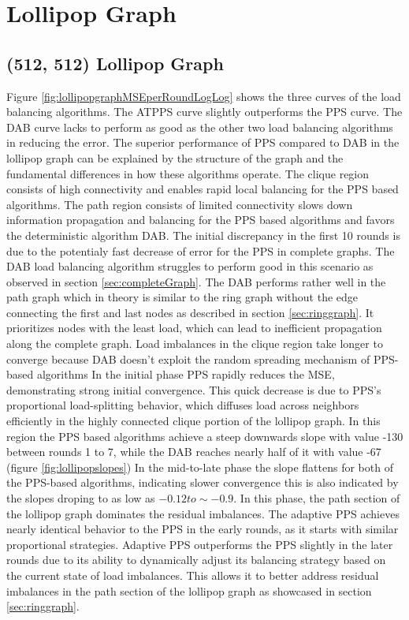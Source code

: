 \section{Lollipop Graph}\label{sec:lollipopgraph}
\subsection{(512, 512) Lollipop Graph}
Figure \ref{fig:lollipopgraphMSEperRoundLogLog} shows the three curves of the load balancing algorithms. The ATPPS curve slightly outperforms the PPS curve. The DAB curve lacks to perform as good as the other two load balancing algorithms in reducing the error. The superior performance of PPS compared to DAB in the lollipop graph can be explained by the structure of the graph and the fundamental differences in how these algorithms operate. The clique region consists of high connectivity and enables rapid local balancing for the PPS based algorithms. The path region consists of limited connectivity slows down information propagation and balancing for the PPS based algorithms and favors the deterministic algorithm DAB. The initial discrepancy in the first 10 rounds is due to the potentialy fast decrease of error for the PPS in complete graphs. The DAB load balancing algorithm struggles to perform good in this scenario as observed in section \ref{sec:completeGraph}. The DAB performs rather well in the path graph which in theory is similar to the ring graph without the edge connecting the first and last nodes as described in section \ref{sec:ringgraph}. It prioritizes nodes with the least load, which can lead to inefficient propagation along the complete graph. Load imbalances in the clique region take longer to converge because DAB doesn't exploit the random spreading mechanism of PPS-based algorithms In the initial phase PPS rapidly reduces the MSE, demonstrating strong initial convergence. This quick decrease is due to PPS's proportional load-splitting behavior, which diffuses load across neighbors efficiently in the highly connected clique portion of the lollipop graph. In this region the PPS based algorithms achieve a steep downwards slope with value -130 between rounds 1 to 7, while the DAB reaches nearly half of it with value -67 (figure \ref{fig:lollipopslopes}) In the mid-to-late phase the slope flattens for both of the PPS-based algorithms, indicating slower convergence this is also indicated by the slopes droping to as low as $-0.12 to \sim-0.9$. In this phase, the path section of the lollipop graph dominates the residual imbalances. The adaptive PPS achieves nearly identical behavior to the PPS in the early rounds, as it starts with similar proportional strategies. Adaptive PPS outperforms the PPS slightly in the later rounds due to its ability to dynamically adjust its balancing strategy based on the current state of load imbalances. This allows it to better address residual imbalances in the path section of the lollipop graph as showcased in section \ref{sec:ringgraph}.

